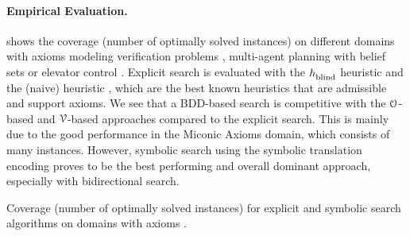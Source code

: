 \paragraph{Empirical Evaluation.}
 shows the coverage (number of optimally solved instances) on different domains with axioms modeling verification problems \autocite{ghosh-et-al-jar2015,edelkamp-icaps2003wscompetition}, multi-agent planning with belief sets \autocite{kominis-geffner-icaps2015} or elevator control \autocite{koehler-schuster-aips2000}. 
Explicit \astar{} search \autocite{hart-et-al-ieeessc1968} is evaluated with the $h_\text{\scriptsize{blind}}^\text{\scriptsize{}}$ heuristic and the (naive)  heuristic \autocite{ivankovic-haslum-ijcai2015}, which are the best known heuristics that are admissible and support axioms. 
We see that a BDD-based search is competitive with the $\mathcal O$-based and $\mathcal V$-based approaches compared to the explicit \astar{} search. 
This is mainly due to the good performance in the Miconic Axioms domain, which consists of many instances. 
However, symbolic search using the symbolic translation encoding proves to be the best performing and overall dominant approach, especially with bidirectional search.


\begin{table}
    \begin{center}
        \resizebox{1\textwidth}{!}{
            
        }
    \end{center}
    \caption[Coverage for planning with axioms.]{Coverage (number of optimally solved instances) for explicit and symbolic search algorithms on domains with axioms \autocite{speck-et-al-icaps2019}.}
    \label{tab:coverage_axioms}
\end{table}

